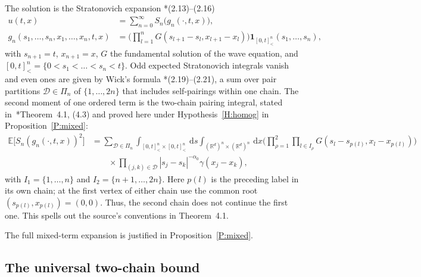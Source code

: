 \documentclass[12pt,oneside,openany]{book}
\numberwithin{equation}{section}
\theoremstyle{nogostyle}
\theoremstyle{definition}
\newcommand{\R}{\mathbb{R}}
\newcommand{\E}{\mathbb{E}}
\newcommand{\ud}{\,\mathrm{d}}
\begin{document}
The solution is the Stratonovich expansion
\cite{chen:author2026:time-dependency}*{(2.13)--(2.16)}
\begin{equation}\label{E:expansion}
  \begin{split}
    u(t,x)&=\sum_{n=0}^\infty S_n\big(g_n(\cdot,t,x)\big),\\
    g_n(s_1,\dots,s_n,x_1,\dots,x_n,t,x)
    &=\Big(\prod_{l=1}^nG(s_{l+1}-s_l,x_{l+1}-x_l)\Big)
    \mathbf{1}_{[0,t]^n_<}(s_1,\dots,s_n),
  \end{split}
\end{equation}
with $s_{n+1} = t$, $x_{n+1} = x$, $G$ the fundamental solution of the wave
equation, and $[0,t]^n_ < = \{0<s_1<\dots<s_n<t\}$. Odd expected Stratonovich
integrals vanish and even ones are given by Wick's formula
\cite{chen:author2026:time-dependency}*{(2.19)--(2.21)}, a sum over pair
partitions $\mathcal{D} \in \Pi_n$ of $\{1,\dots,2n\}$ that includes
self-pairings within one chain. The second moment of one ordered term is the
two-chain pairing integral, stated
in~\cite{chen:author2026:time-dependency}*{Theorem~4.1, (4.3)} and proved here
under Hypothesis~\ref{H:homog} in Proposition~\ref{P:mixed}:
\begin{equation}\label{E:Sn2}
  \begin{split}
    \E\big[S_n(g_n(\cdot,t,x))^2\big]
    &=\sum_{\mathcal{D}\in\Pi_n}\int_{[0,t]^n_<\times[0,t]^n_<}\ud s
    \int_{(\R^d)^n\times(\R^d)^n}\ud x
    \Big(\prod_{\rho=1}^2\prod_{l\in I_\rho}
    G(s_l-s_{p(l)},x_l-x_{p(l)})\Big)\\
    &\qquad\times\prod_{(j,k)\in\mathcal{D}}|s_j-s_k|^{-\alpha_0}\gamma(x_j-x_k),
  \end{split}
\end{equation}
with $I_1 = \{1,\dots,n\}$ and $I_2 = \{n+1,\dots,2n\}$. Here $p(l)$ is the
preceding label in its own chain; at the first vertex of either chain use the
common root $(s_{p(l)},x_{p(l)}) = (0,0)$. Thus, the second chain does not
continue the first one. This spells out the source's conventions in Theorem~4.1.

The full mixed-term expansion is justified in Proposition~\ref{P:mixed}.

\subsection{The universal two-chain bound}
\end{document}
